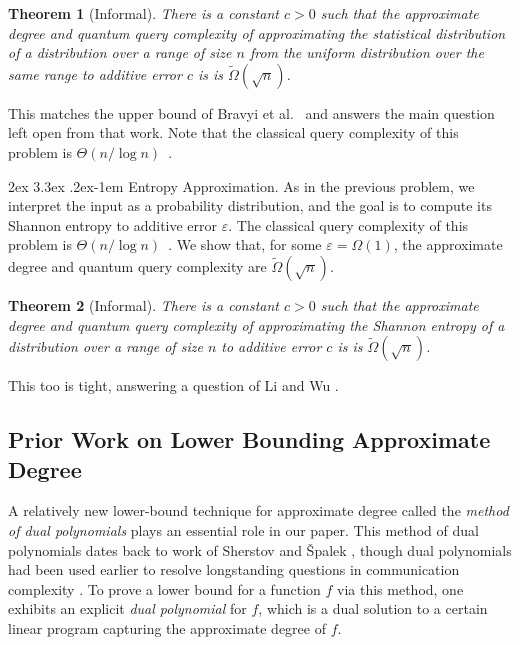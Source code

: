 \documentclass[11pt, letterpaper, fleqn]{article}
\makeatletter
\newcommand{\para}{
  \@startsection{paragraph}{4}
  {\z@}{2ex \@plus 3.3ex \@minus .2ex}{-1em}
  {\normalfont\normalsize\bfseries}
}
\newtheorem{theorem}{Theorem}
\theoremstyle{plain}
\newcommand{\eps}{\varepsilon}
\makeatother
\begin{document}
\begin{theorem}[Informal]  \label{thm:sdu} There is a constant $c > 0$ such that the approximate degree and quantum query complexity of approximating the statistical distribution of a distribution over a range of size $n$ from the uniform distribution over the same range to additive error $c$ is 
is $\tilde{\Omega}(\sqrt{n})$. 
\end{theorem}

This matches the upper bound of Bravyi et al.~\cite{bravyi} and answers the main question left open from that work. Note that the classical query complexity of this problem is $\Theta(n/\log n)$~\cite{VV11}.


\para{Entropy Approximation.} As in the previous problem, we interpret the input as a probability distribution, and the goal is to compute its Shannon entropy to additive error $\eps$. The classical query complexity of this problem is $\Theta(n/\log n)$~\cite{VV11}. We show that, for some $\eps=\Omega(1)$,  the approximate degree and quantum query complexity are $\tilde{\Omega}(\sqrt{n})$. 

 
 \begin{theorem}[Informal]  \label{thm:introentropy} There is a constant $c > 0$ such that the approximate degree and quantum query complexity of approximating the Shannon
 entropy of a distribution over a range of size $n$ to additive error $c$ is 
is $\tilde{\Omega}(\sqrt{n})$. \end{theorem}

This too is tight, answering a question of Li and Wu \cite{entropy}. 



\subsection{Prior Work on Lower Bounding Approximate Degree}
A relatively new lower-bound technique for approximate degree called the \emph{method of dual polynomials} plays an essential role in our paper.
This method of dual polynomials 
dates back to work of Sherstov \cite{sherstovhalfspaces1} and \v{S}palek \cite{spalek},
though dual polynomials had been used earlier to resolve longstanding questions
in communication complexity \cite{patmat, shizhu, sherstovmajmaj, comm7, comm9}.
To prove a lower bound for a function $f$
via this method, one exhibits an explicit \emph{dual polynomial} for $f$, 
which is a dual solution to a certain linear program capturing the approximate degree of $f$. 
\end{document}
